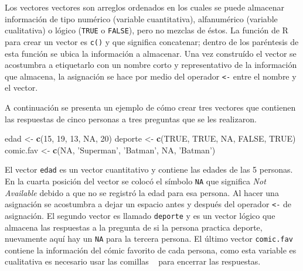 \documentclass[10pt,]{krantz}
\makeatletter
\newenvironment{Shaded}{\begin{snugshade}}{\end{snugshade}}
\newcommand{\KeywordTok}[1]{\textcolor[rgb]{0.13,0.29,0.53}{\textbf{{#1}}}}
\newcommand{\DecValTok}[1]{\textcolor[rgb]{0.00,0.00,0.81}{{#1}}}
\newcommand{\StringTok}[1]{\textcolor[rgb]{0.31,0.60,0.02}{{#1}}}
\newcommand{\OtherTok}[1]{\textcolor[rgb]{0.56,0.35,0.01}{{#1}}}
\newcommand{\NormalTok}[1]{{#1}}
\let\proglang=\textsf
\newenvironment{kframe}{%
\medskip{}
\setlength{\fboxsep}{.8em}
 \def\at@end@of@kframe{}%
 \ifinner\ifhmode%
  \def\at@end@of@kframe{\end{minipage}}%
  \begin{minipage}{\columnwidth}%
 \fi\fi%
 \def\FrameCommand##1{\hskip\@totalleftmargin \hskip-\fboxsep
 \colorbox{shadecolor}{##1}\hskip-\fboxsep
     \hskip-\linewidth \hskip-\@totalleftmargin \hskip\columnwidth}%
 \MakeFramed {\advance\hsize-\width
   \@totalleftmargin\z@ \linewidth\hsize
   \@setminipage}}%
 {\par\unskip\endMakeFramed%
 \at@end@of@kframe}
\renewenvironment{Shaded}{\begin{kframe}}{\end{kframe}}
\makeatother
\begin{document}
Los vectores vectores son arreglos ordenados en los cuales se puede
almacenar información de tipo numérico (variable cuantitativa),
alfanumérico (variable cualitativa) o lógico (\texttt{TRUE} o
\texttt{FALSE}), pero no mezclas de éstos. La función de \proglang{R}
para crear un vector es \texttt{c()} y que significa concatenar; dentro
de los paréntesis de esta función se ubica la información a almacenar.
Una vez construído el vector se acostumbra a etiquetarlo con un nombre
corto y representativo de la información que almacena, la asignación se
hace por medio del operador \texttt{\textless{}-} entre el nombre y el
vector.

A continuación se presenta un ejemplo de cómo crear tres vectores que
contienen las respuestas de cinco personas a tres preguntas que se les
realizaron.

\begin{Shaded}
\begin{Highlighting}[]
\NormalTok{edad <-}\StringTok{ }\KeywordTok{c}\NormalTok{(}\DecValTok{15}\NormalTok{, }\DecValTok{19}\NormalTok{, }\DecValTok{13}\NormalTok{, }\OtherTok{NA}\NormalTok{, }\DecValTok{20}\NormalTok{)}
\NormalTok{deporte <-}\StringTok{ }\KeywordTok{c}\NormalTok{(}\OtherTok{TRUE}\NormalTok{, }\OtherTok{TRUE}\NormalTok{, }\OtherTok{NA}\NormalTok{, }\OtherTok{FALSE}\NormalTok{, }\OtherTok{TRUE}\NormalTok{)}
\NormalTok{comic.fav <-}\StringTok{ }\KeywordTok{c}\NormalTok{(}\OtherTok{NA}\NormalTok{, }\StringTok{'Superman'}\NormalTok{, }\StringTok{'Batman'}\NormalTok{, }\OtherTok{NA}\NormalTok{, }\StringTok{'Batman'}\NormalTok{)}
\end{Highlighting}
\end{Shaded}

El vector \texttt{edad} es un vector cuantitativo y contiene las edades
de las 5 personas. En la cuarta posición del vector se colocó el símbolo
\texttt{NA} que significa \textit{Not Available} debido a que no se
registró la edad para esa persona. Al hacer una asignación se acostumbra
a dejar un espacio antes y después del operador \texttt{\textless{}-} de
asignación. El segundo vector es llamado \texttt{deporte} y es un vector
lógico que almacena las respuestas a la pregunta de si la persona
practica deporte, nuevamente aquí hay un \texttt{NA} para la tercera
persona. El último vector \texttt{comic.fav} contiene la información del
cómic favorito de cada persona, como esta variable es cualitativa es
necesario usar las comillas
\texttt{\textquotesingle{}\ \textquotesingle{}} para encerrar las
respuestas.
\end{document}
